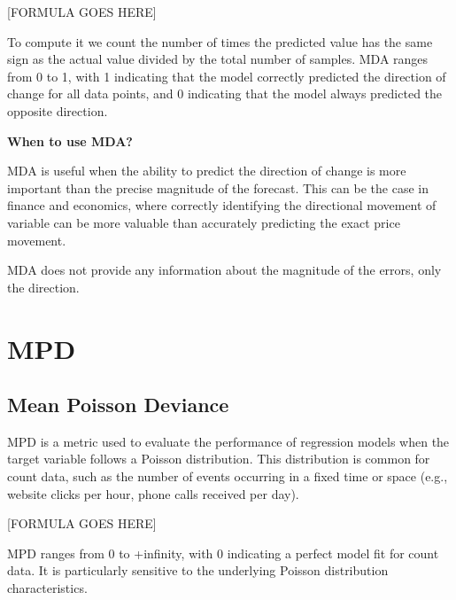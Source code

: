 \begin{center}
    [FORMULA GOES HERE]
\end{center}

To compute it we count the number of times the predicted value has the same sign as the actual value divided by the total number of samples. MDA ranges from 0 to 1, with 1 indicating
that the model correctly predicted the direction of change for all data points, and 0 indicating that the model
always predicted the opposite direction.

\textbf{When to use MDA?}

MDA is useful when the ability to predict the direction of change is more important than the precise magnitude of the forecast. This can be the case in finance and economics,
where correctly identifying the directional movement of variable can be more valuable than accurately predicting the exact price movement.

{
    \item MDA does not provide any information about the magnitude of the errors, only the direction.
}

\clearpage
\thispagestyle{regressionstyle}
\section{MPD}
\subsection{Mean Poisson Deviance}

MPD is a metric used to evaluate the performance of regression models when the target variable follows a Poisson distribution. This distribution is common for count data, such as the number
of events occurring in a fixed time or space (e.g., website clicks per hour, phone calls received per day).

\begin{center}
    [FORMULA GOES HERE]
\end{center}

MPD ranges from 0 to +infinity, with 0 indicating a perfect model fit for count data. It is particularly sensitive to the underlying Poisson distribution characteristics.


